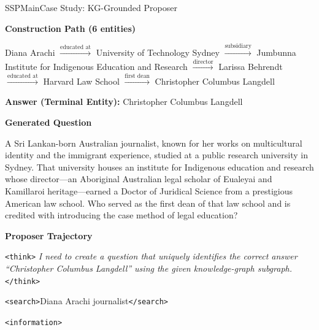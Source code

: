\begin{casepagebox}{SSPMain}{Case Study: KG-Grounded Proposer}

\noindent\colorbox{TagInfo!20}{\parbox{\dimexpr\linewidth-2\fboxsep}{\textcolor{TagInfo}{\textbf{Construction Path (6 entities)}}}}

{\small Diana Arachi $\xrightarrow{\text{educated at}}$ University of Technology Sydney $\xrightarrow{\text{subsidiary}}$ Jumbunna Institute for Indigenous Education and Research $\xrightarrow{\text{director}}$ Larissa Behrendt $\xrightarrow{\text{educated at}}$ Harvard Law School $\xrightarrow{\text{first dean}}$ Christopher Columbus Langdell}

\vspace{3mm}
\noindent\colorbox{TagAnswer!20}{\parbox{\dimexpr\linewidth-2\fboxsep}{\textcolor{TagAnswer}{\textbf{Answer (Terminal Entity): }} Christopher Columbus Langdell}}

\vspace{3mm}
\noindent\colorbox{TagSearch!20}{\parbox{\dimexpr\linewidth-2\fboxsep}{\textcolor{TagSearch}{\textbf{Generated Question}}}}

A Sri Lankan-born Australian journalist, known for her works on multicultural identity and the immigrant experience, studied at a public research university in Sydney.
That university houses an institute for Indigenous education and research whose director---an Aboriginal Australian legal scholar of Eualeyai and Kamillaroi heritage---earned a Doctor of Juridical Science from a prestigious American law school.
Who served as the first dean of that law school and is credited with introducing the case method of legal education?

\vspace{3mm}
\noindent\colorbox{SSPMain!20}{\parbox{\dimexpr\linewidth-2\fboxsep}{\textcolor{SSPMain}{\textbf{Proposer Trajectory}}}}

\begin{thinkpanel}
\textcolor{TagThink}{\texttt{<think>}} \textit{I need to create a question that uniquely identifies the correct answer ``Christopher Columbus Langdell'' using the given knowledge-graph subgraph.} \textcolor{TagThink}{\texttt{</think>}}
\end{thinkpanel}

\textcolor{TagSearch}{\texttt{<search>}}Diana Arachi journalist\textcolor{TagSearch}{\texttt{</search>}}

\textcolor{TagInfo}{\texttt{<information>}}


\end{casepagebox}
